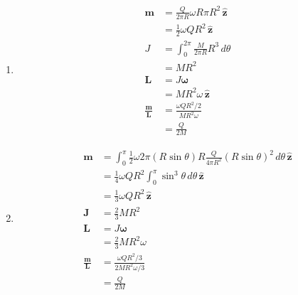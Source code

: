 \documentclass{article}
\renewcommand{\vec}[1]{\boldsymbol{\mathbf{#1}}}
\newcommand{\uvec}[1]{\hat{\vec{#1}}}
\begin{document}
\subsection{}

\begin{enumerate}
  \item

        \begin{align*}
          \vec{m}                 & = \frac{Q}{2 \pi R} \omega R \pi R^2 \,\uvec{z}   \\
                                  & = \frac{1}{2} \omega Q R^2 \,\uvec{z}             \\
          J                       & = \int_0^{2 \pi} \frac{M}{2 \pi R} R^3 \,d \theta \\
                                  & = M R^2                                           \\
          \vec{L}                 & = J \vec{\omega}                                  \\
                                  & = M R^2 \omega \,\uvec{z}                         \\
          \frac{\vec{m}}{\vec{L}} & = \frac{\omega Q R^2 / 2}{M R^2 \omega}           \\
                                  & = \frac{Q}{2 M}
        \end{align*}

  \item

        \begin{align*}
          \vec{m}                 & = \int_0^\pi \frac{1}{2} \omega 2 \pi (R \sin \theta) R \frac{Q}{4 \pi R^2} (R \sin \theta)^2 \,d \theta \,\uvec{z} \\
                                  & = \frac{1}{4} \omega Q R^2 \int_0^\pi \sin^3 \theta \,d \theta \,\uvec{z}                                           \\
                                  & = \frac{1}{3} \omega Q R^2 \,\uvec{z}                                                                               \\
          \vec{J}                 & = \frac{2}{3} M R^2                                                                                                 \\
          \vec{L}                 & = J \vec{\omega}                                                                                                    \\
                                  & = \frac{2}{3} M R^2 \omega                                                                                          \\
          \frac{\vec{m}}{\vec{L}} & = \frac{\omega Q R^2 / 3}{2 M R^2 \omega / 3}                                                                       \\
                                  & = \frac{Q}{2 M}
        \end{align*}
\end{enumerate}
\end{document}
